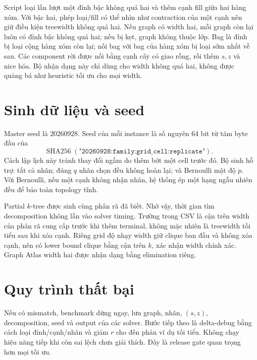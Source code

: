 Script  loại lần lượt một đỉnh bậc không quá hai và thêm cạnh fill giữa hai hàng xóm. Với bậc hai, phép loại/fill có thể nhìn như contraction của một cạnh nên giữ điều kiện treewidth không quá hai. Nếu graph có width hai, mỗi graph còn lại luôn có đỉnh bậc không quá hai; nếu bị kẹt, graph không thuộc lớp. Bag là đỉnh bị loại cộng hàng xóm còn lại; nối bag với bag của hàng xóm bị loại sớm nhất về sau. Các component rời được nối bằng cạnh cây có giao rỗng, rồi thêm $s,z$ và nice hóa. Bộ nhận dạng này chỉ dùng cho width không quá hai, không được quảng bá như heuristic tối ưu cho mọi width.

\section{Sinh dữ liệu và seed}

Master seed là $20260928$. Seed của mỗi instance là số nguyên 64 bit từ tám byte đầu của
\[
\operatorname{SHA256}(\texttt{"20260928:family:grid\_cell:replicate"}).
\]
Cách lập lịch này tránh thay đổi ngầm do thêm bớt một cell trước đó. Bộ sinh hỗ trợ: tất cả nhãn; đúng $q$ nhãn chọn đều không hoàn lại; và Bernoulli mật độ $p$. Với Bernoulli, nếu một cạnh không nhận nhãn, hệ thống ép một hạng ngẫu nhiên đều để bảo toàn topology tĩnh.

Partial $k$-tree được sinh cùng phân rã đã biết. Nhờ vậy, thời gian tìm decomposition không lẫn vào solver timing. Trường  trong CSV là cận trên width của phân rã cung cấp trước khi thêm terminal, không mặc nhiên là treewidth tối tiểu sau khi xóa cạnh. Riêng grid độ nhạy width giữ clique ban đầu và không xóa cạnh, nên có lower bound clique bằng cận trên $k$, xác nhận width chính xác. Graph Atlas width hai được nhận dạng bằng elimination riêng.

\section{Quy trình thất bại}

Nếu có mismatch, benchmark dừng ngay, lưu graph, nhãn, $(s,z)$, decomposition, seed và output của các solver. Bước tiếp theo là delta-debug bằng cách loại đỉnh/cạnh/nhãn và giảm $r$ cho đến phản ví dụ tối tiểu. Không chạy hiệu năng tiếp khi còn sai lệch chưa giải thích. Đây là release gate quan trọng hơn mọi tối ưu.
